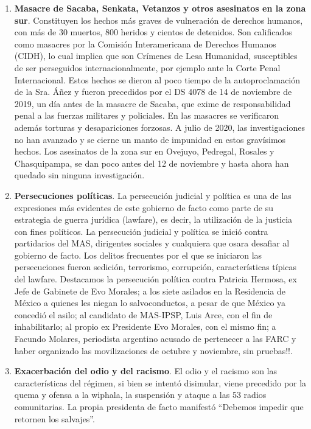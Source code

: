 \documentclass[a4paper, nobind]{templates/ociamthesis}
\begin{document}
\begin{enumerate}
\def\labelenumi{\arabic{enumi}.}
\item
  \textbf{Masacre de Sacaba, Senkata, Vetanzos y otros asesinatos en la zona sur}. Constituyen los hechos más graves de vulneración de derechos humanos, con más de 30 muertos, 800 heridos y cientos de detenidos. Son calificados como masacres por la Comisión Interamericana de Derechos Humanos (CIDH), lo cual implica que son Crímenes de Lesa Humanidad, susceptibles de ser perseguidos internacionalmente, por ejemplo ante la Corte Penal Internacional. Estos hechos se dieron al poco tiempo de la autoproclamación de la Sra. Áñez y fueron precedidos por el DS 4078 de 14 de noviembre de 2019, un día antes de la masacre de Sacaba, que exime de responsabilidad penal a las fuerzas militares y policiales. En las masacres se verificaron además torturas y desapariciones forzosas. A julio de 2020, las investigaciones no han avanzado y se cierne un manto de impunidad en estos gravísimos hechos. Los asesinatos de la zona sur en Ovejuyo, Pedregal, Rosales y Chasquipampa, se dan poco antes del 12 de noviembre y hasta ahora han quedado sin ninguna investigación.
\item
  \textbf{Persecuciones políticas}. La persecución judicial y política es una de las expresiones más evidentes de este gobierno de facto como parte de su estrategia de guerra jurídica (lawfare), es decir, la utilización de la justicia con fines políticos. La persecución judicial y política se inició contra partidarios del MAS, dirigentes sociales y cualquiera que osara desafiar al gobierno de facto. Los delitos frecuentes por el que se iniciaron las persecuciones fueron sedición, terrorismo, corrupción, características típicas del lawfare. Destacamos la persecución política contra Patricia Hermosa, ex Jefe de Gabinete de Evo Morales; a los siete asilados en la Residencia de México a quienes les niegan lo salvoconductos, a pesar de que México ya concedió el asilo; al candidato de MAS-IPSP, Luis Arce, con el fin de inhabilitarlo; al propio ex Presidente Evo Morales, con el mismo fin; a Facundo Molares, periodista argentino acusado de pertenecer a las FARC y haber organizado las movilizaciones de octubre y noviembre, sin pruebas!!.
\item
  \textbf{Exacerbación del odio y del racismo}. El odio y el racismo son las características del régimen, si bien se intentó disimular, viene precedido por la quema y ofensa a la wiphala, la suspensión y ataque a las 53 radios comunitarias. La propia presidenta de facto manifestó ``Debemos impedir que retornen los salvajes''.

\end{enumerate}
\end{document}
